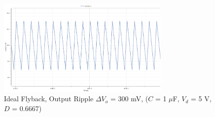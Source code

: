 \documentclass[12pt,twoside]{scrartcl}
\begin{document}
\begin{figure}[htp]
    \centering
    \includegraphics[width=0.75\textwidth]{RippleIdealSim5V.png}
    \caption{Ideal Flyback, Output Ripple $\Delta V_o$ = 300 mV, ($C$ = 1 $\mu$F, $V_d$ = 5 V, $D$ = 0.6667)}
    \label{fig:RippleIdealSim5V}
\end{figure}


\newpage
\end{document}
